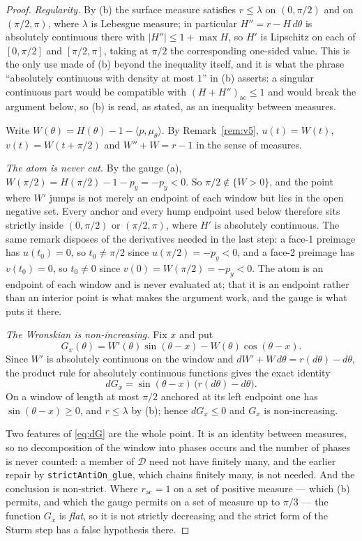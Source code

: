 \documentclass[11pt]{article}
\theoremstyle{definition}
\begin{document}
\begin{proof}
\emph{Regularity.} By (b) the surface measure satisfies $r\le\lambda$ on $(0,\pi/2)$ and on
$(\pi/2,\pi)$, where $\lambda$ is Lebesgue measure; in particular $H''=r-H\,d\theta$ is
absolutely continuous there with $|H''|\le1+\max H$, so $H'$ is Lipschitz on each of
$[0,\pi/2]$ and $[\pi/2,\pi]$, taking at $\pi/2$ the corresponding one-sided value. This is
the only use made of (b) beyond the inequality itself, and it is what the phrase
``absolutely continuous with density at most $1$'' in (b) asserts: a singular continuous part
would be compatible with $(H+H'')_{\mathrm{ac}}\le1$ and would break the argument below, so
(b) is read, as stated, as an inequality between measures.

Write $W(\theta)=H(\theta)-1-\langle p,\mu_\theta\rangle$. By Remark~\ref{rem:v5},
$u(t)=W(t)$, $v(t)=W(t+\pi/2)$ and $W''+W=r-1$ in the sense of measures.

\emph{The atom is never cut.} By the gauge (a), $W(\pi/2)=H(\pi/2)-1-p_y=-p_y<0$. So
$\pi/2\notin\{W>0\}$, and the point where $W'$ jumps is not merely an endpoint of each window
but lies in the open negative set. Every anchor and every hump endpoint used below therefore
sits strictly inside $(0,\pi/2)$ or $(\pi/2,\pi)$, where $H'$ is absolutely continuous. The
same remark disposes of the derivatives needed in the last step: a face-1 preimage has
$u(t_0)=0$, so $t_0\ne\pi/2$ since $u(\pi/2)=-p_y<0$, and a face-2 preimage has $v(t_0)=0$,
so $t_0\ne0$ since $v(0)=W(\pi/2)=-p_y<0$. The atom is an endpoint of each window and is
never evaluated at; that it is an endpoint rather than an interior point is what makes the
argument work, and the gauge is what puts it there.

\emph{The Wronskian is non-increasing.} Fix $x$ and put
\[
  G_x(\theta)=W'(\theta)\sin(\theta-x)-W(\theta)\cos(\theta-x).
\]
Since $W'$ is absolutely continuous on the window and $dW'+W\,d\theta=r(d\theta)-d\theta$,
the product rule for absolutely continuous functions gives the exact identity
\begin{equation}\label{eq:dG}
  dG_x=\sin(\theta-x)\,\bigl(r(d\theta)-d\theta\bigr).
\end{equation}
On a window of length at most $\pi/2$ anchored at its left endpoint one has
$\sin(\theta-x)\ge0$, and $r\le\lambda$ by (b); hence $dG_x\le0$ and $G_x$ is
non-increasing.

Two features of \eqref{eq:dG} are the whole point. It is an identity between measures, so no
decomposition of the window into phases occurs and the number of phases is never counted: a
member of $\mathcal D$ need not have finitely many, and the earlier repair by
\verb|strictAntiOn_glue|, which chains finitely many, is not needed. And the conclusion is
non-strict. Where $r_{\mathrm{ac}}=1$ on a set of positive measure --- which (b) permits, and
which the gauge permits on a set of measure up to $\pi/3$ --- the function $G_x$ is
\emph{flat}, so it is not strictly decreasing and the strict form of the Sturm step has a
false hypothesis there.


\end{proof}
\end{document}
